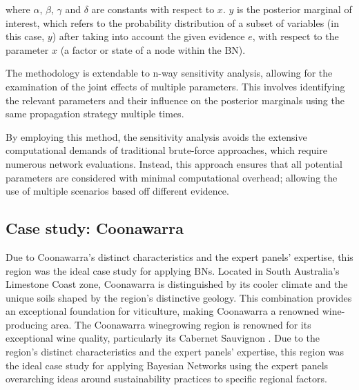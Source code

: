 \documentclass[fleqn,10pt]{wlscirep}
\begin{document}
where $\alpha$, $\beta$, $\gamma$ and $\delta$ are constants with respect to $x$. $y$ is the posterior marginal of interest, which refers to the probability distribution of a subset of variables (in this case, $y$) after taking into account the given evidence $e$, with respect to the parameter $x$ (a factor or state of a node within the BN).








The methodology is extendable to n-way sensitivity analysis, allowing for the examination of the joint effects of multiple parameters. This involves identifying the relevant parameters and their influence on the posterior marginals using the same propagation strategy multiple times.

By employing this method, the sensitivity analysis avoids the extensive computational demands of traditional brute-force approaches, which require numerous network evaluations. Instead, this approach ensures that all potential parameters are considered with minimal computational overhead; allowing the use of multiple scenarios based off different evidence.

\subsection{Case study: Coonawarra}

Due to Coonawarra's distinct characteristics and the expert panels' expertise, this region was the ideal case study for applying BNs. Located in South Australia's Limestone Coast zone, Coonawarra is distinguished by its cooler climate and the unique soils shaped by the region's distinctive geology. This combination provides an exceptional foundation for viticulture, making Coonawarra a renowned wine-producing area. The Coonawarra winegrowing region is renowned for its exceptional wine quality, particularly its Cabernet Sauvignon . Due to the region's distinct characteristics and the expert panels' expertise, this region was the ideal case study for applying Bayesian Networks using the expert panels overarching ideas around sustainability practices to specific regional factors.
\end{document}
